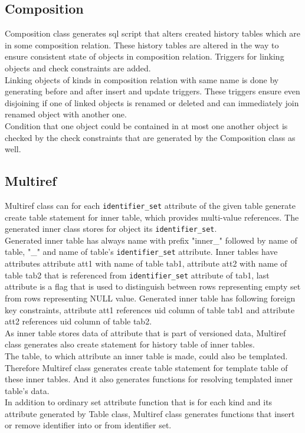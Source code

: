 \documentclass[deska]{subfiles}
\begin{document}

\subsection{Composition}
Composition class generates sql script that alters created history tables which are in some composition relation. These history tables are altered in the way to ensure consistent state of objects in composition relation. Triggers for linking objects and check constraints are added.\\
Linking objects of kinds in composition relation with same name is done by generating before and after insert and update triggers. These triggers ensure even disjoining if one of linked objects is renamed or deleted and can immediately join renamed object with another one.\\
Condition that one object could be contained in at most one another object is checked by the check constraints that are generated by the Composition class as well.

\subsection{Multiref}
Multiref class can for each {\tt identifier\_set} attribute of the given table generate create table statement for inner table, which provides multi-value references. The generated inner class stores for object its {\tt identifier\_set}.\\
Generated inner table has always name with prefix "inner\_" followed by name of table, "\_" and name of table's {\tt identifier\_set} attribute. Inner tables have attributes attribute att1 with name of table tab1, attribute att2 with name of table tab2 that is referenced from {\tt identifier\_set} attribute of tab1, last attribute is a flag that is used to distinguish between rows representing empty set from rows representing NULL value. Generated inner table has following foreign key constraints, attribute att1 references uid column of table tab1 and attribute att2 references uid column of table tab2.\\
As inner table stores data of attribute that is part of versioned data, Multiref class generates also create statement for history table of inner tables.\\ 
The table, to which attribute an inner table is made, could also be templated. Therefore Multiref class generates create table statement for template table of these inner tables. And it also generates functions for resolving templated inner table's data.\\
In addition to ordinary set attribute function that is for each kind and its attribute generated by Table class, Multiref class generates functions that insert or remove identifier into or from identifier set.
\end{document}
